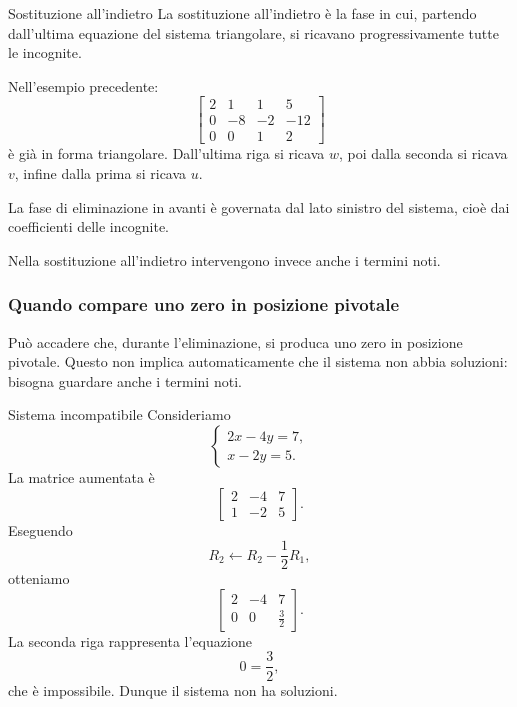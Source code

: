 \documentclass[a4paper]{article}
\begin{document}
\begin{snippetdefinition}{Sostituzione all'indietro}
    La sostituzione all'indietro è la fase in cui, partendo dall'ultima equazione del sistema triangolare, si ricavano progressivamente tutte le incognite.
\end{snippetdefinition}

Nell'esempio precedente:
\[
    \left[
        \begin{array}{ccc|c}
            2 & 1 & 1 & 5\\
            0 & -8 & -2 & -12\\
            0 & 0 & 1 & 2
        \end{array}
    \right]
\]
è già in forma triangolare. Dall'ultima riga si ricava \(w\), poi dalla seconda si ricava \(v\), infine dalla prima si ricava \(u\).

\begin{snippetremark}{}
    La fase di eliminazione in avanti è governata dal lato sinistro del sistema, cioè dai coefficienti delle incognite.

    Nella sostituzione all'indietro intervengono invece anche i termini noti.
\end{snippetremark}

\subsubsection{Quando compare uno zero in posizione pivotale}

Può accadere che, durante l'eliminazione, si produca uno zero in posizione pivotale. Questo non implica automaticamente che il sistema non abbia soluzioni: bisogna guardare anche i termini noti.

\begin{snippetexample}{Sistema incompatibile}
    Consideriamo
    \[
        \begin{cases}
            2x-4y=7,\\
            x-2y=5.
        \end{cases}
    \]
    La matrice aumentata è
    \[
        \left[
            \begin{array}{cc|c}
                2 & -4 & 7\\
                1 & -2 & 5
            \end{array}
        \right].
    \]
    Eseguendo
    \[
        R_2\leftarrow R_2-\frac{1}{2}R_1,
    \]
    otteniamo
    \[
        \left[
            \begin{array}{cc|c}
                2 & -4 & 7\\
                0 & 0 & \frac{3}{2}
            \end{array}
        \right].
    \]
    La seconda riga rappresenta l'equazione
    \[
        0=\frac{3}{2},
    \]
    che è impossibile. Dunque il sistema non ha soluzioni.
\end{snippetexample}
\end{document}
